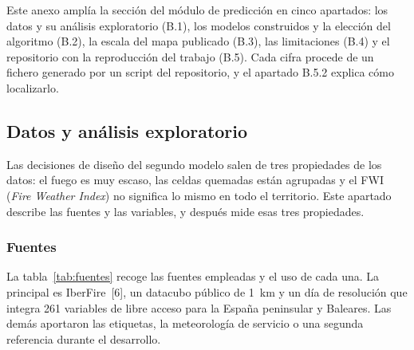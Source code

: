 \documentclass[10pt,a4paper]{article}
\begin{document}
Este anexo amplía la sección del módulo de predicción en cinco apartados: los
datos y su análisis exploratorio (B.1), los modelos construidos y la elección
del algoritmo (B.2), la escala del mapa publicado (B.3), las limitaciones
(B.4) y el repositorio con la reproducción del trabajo (B.5). Cada cifra
procede de un fichero generado por un script del repositorio, y el apartado
B.5.2 explica cómo localizarlo.

\subsection{Datos y análisis exploratorio}
\label{an:b1}

Las decisiones de diseño del segundo modelo salen de tres propiedades de los
datos: el fuego es muy escaso, las celdas quemadas están agrupadas y el FWI
(\emph{Fire Weather Index}) no significa lo mismo en todo el territorio. Este
apartado describe las fuentes y las variables, y después mide esas tres
propiedades.

\subsubsection{Fuentes}
\label{an:b1-fuentes}

La tabla~\ref{tab:fuentes} recoge las fuentes empleadas y el uso de cada una.
La principal es IberFire~[6], un datacubo público de 1~km y un día de
resolución que integra 261 variables de libre acceso para la España
peninsular y Baleares. Las demás aportaron las etiquetas, la meteorología de
servicio o una segunda referencia durante el desarrollo.
\end{document}
